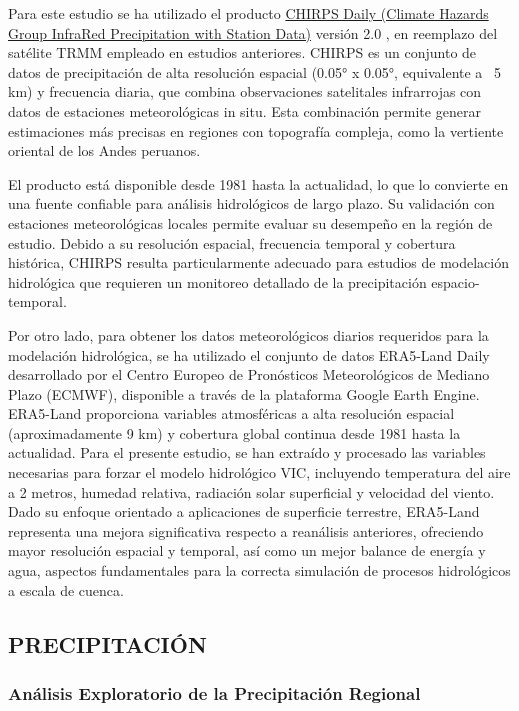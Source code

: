 Para este estudio se ha utilizado el producto
\href{https://data.chc.ucsb.edu/products/CHIRPS-2.0/}{CHIRPS Daily (Climate
Hazards Group InfraRed Precipitation with Station Data)} versión 2.0
\parencite{funk2015chirps}, en reemplazo del satélite TRMM empleado en estudios
anteriores. CHIRPS es un conjunto de datos de precipitación de alta resolución
espacial (0.05° x 0.05°, equivalente a ~5 km) y frecuencia diaria, que combina
observaciones satelitales infrarrojas con datos de estaciones meteorológicas in
situ. Esta combinación permite generar estimaciones más precisas en regiones con
topografía compleja, como la vertiente oriental de los Andes peruanos.

El producto está disponible desde 1981 hasta la actualidad, lo que lo convierte
en una fuente confiable para análisis hidrológicos de largo plazo. Su validación
con estaciones meteorológicas locales permite evaluar su desempeño en la región
de estudio. Debido a su resolución espacial, frecuencia temporal y cobertura
histórica, CHIRPS resulta particularmente adecuado para estudios de modelación
hidrológica que requieren un monitoreo detallado de la precipitación
espacio-temporal.

Por otro lado, para obtener los datos meteorológicos diarios requeridos para la
modelación hidrológica, se ha utilizado el conjunto de datos ERA5-Land Daily
\parencite{munoz2021era5land} desarrollado por el Centro Europeo de Pronósticos
Meteorológicos de Mediano Plazo (ECMWF), disponible a través de la plataforma
Google Earth Engine. ERA5-Land proporciona variables atmosféricas a alta
resolución espacial (aproximadamente 9 km) y cobertura global continua desde
1981 hasta la actualidad. Para el presente estudio, se han extraído y procesado
las variables necesarias para forzar el modelo hidrológico VIC,
incluyendo temperatura del aire a 2 metros, humedad relativa, radiación solar
superficial y velocidad del viento. Dado su enfoque orientado a aplicaciones de
superficie terrestre, ERA5-Land representa una mejora significativa respecto a
reanálisis anteriores, ofreciendo mayor resolución espacial y temporal, así como
un mejor balance de energía y agua, aspectos fundamentales para la correcta
simulación de procesos hidrológicos a escala de cuenca.

\subsection{PRECIPITACIÓN}

\subsubsection{Análisis Exploratorio de la Precipitación Regional}

